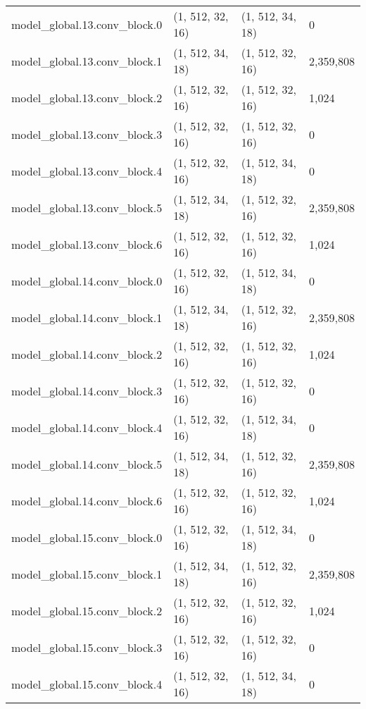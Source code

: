 \begin{longtable}{llll}
        model\_global.13.conv\_block.0 &   (1, 512, 32, 16) &   (1, 512, 34, 18) &           0 \\
        model\_global.13.conv\_block.1 &   (1, 512, 34, 18) &   (1, 512, 32, 16) &   2,359,808 \\
        model\_global.13.conv\_block.2 &   (1, 512, 32, 16) &   (1, 512, 32, 16) &       1,024 \\
        model\_global.13.conv\_block.3 &   (1, 512, 32, 16) &   (1, 512, 32, 16) &           0 \\
        model\_global.13.conv\_block.4 &   (1, 512, 32, 16) &   (1, 512, 34, 18) &           0 \\
        model\_global.13.conv\_block.5 &   (1, 512, 34, 18) &   (1, 512, 32, 16) &   2,359,808 \\
        model\_global.13.conv\_block.6 &   (1, 512, 32, 16) &   (1, 512, 32, 16) &       1,024 \\
        model\_global.14.conv\_block.0 &   (1, 512, 32, 16) &   (1, 512, 34, 18) &           0 \\
        model\_global.14.conv\_block.1 &   (1, 512, 34, 18) &   (1, 512, 32, 16) &   2,359,808 \\
        model\_global.14.conv\_block.2 &   (1, 512, 32, 16) &   (1, 512, 32, 16) &       1,024 \\
        model\_global.14.conv\_block.3 &   (1, 512, 32, 16) &   (1, 512, 32, 16) &           0 \\
        model\_global.14.conv\_block.4 &   (1, 512, 32, 16) &   (1, 512, 34, 18) &           0 \\
        model\_global.14.conv\_block.5 &   (1, 512, 34, 18) &   (1, 512, 32, 16) &   2,359,808 \\
        model\_global.14.conv\_block.6 &   (1, 512, 32, 16) &   (1, 512, 32, 16) &       1,024 \\
        model\_global.15.conv\_block.0 &   (1, 512, 32, 16) &   (1, 512, 34, 18) &           0 \\
        model\_global.15.conv\_block.1 &   (1, 512, 34, 18) &   (1, 512, 32, 16) &   2,359,808 \\
        model\_global.15.conv\_block.2 &   (1, 512, 32, 16) &   (1, 512, 32, 16) &       1,024 \\
        model\_global.15.conv\_block.3 &   (1, 512, 32, 16) &   (1, 512, 32, 16) &           0 \\
        model\_global.15.conv\_block.4 &   (1, 512, 32, 16) &   (1, 512, 34, 18) &           0 \\

\end{longtable}
